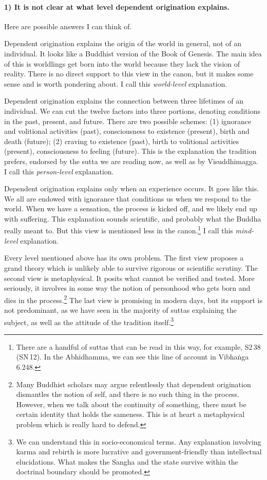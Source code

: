 \paragraph*{1) It is not clear at what level dependent origination explains.} Here are possible answers I can think of.
\begin{compactenum}[(1)]
\item Dependent origination explains the origin of the world in general, not of an individual. It looks like a Buddhist version of the Book of Genesis. The main idea of this is worldlings get born into the world because they lack the vision of reality. There is no direct support to this view in the canon, but it makes some sense and is worth pondering about. I call this \emph{world-level} explanation.
\item Dependent origination explains the connection between three lifetimes of an individual. We can cut the twelve factors into three portions, denoting conditions in the past, present, and future. There are two possible schemes: (1) ignorance and volitional activities (past), consciousness to existence (present), birth and death (future); (2) craving to existence (past), birth to volitional activities (present), consciousness to feeling (future). This is the explanation the tradition prefers, endorsed by the sutta we are reading now, as well as by Visuddhimagga. I call this \emph{person-level} explanation.
\item Dependent origination explains only when an experience occurs. It goes like this. We all are endowed with ignorance that conditions us when we respond to the world. When we have a sensation, the process is kicked off, and we likely end up with suffering. This explanation sounds scientific, and probably what the Buddha really meant to. But this view is mentioned less in the canon.\footnote{There are a handful of suttas that can be read in this way, for example, S2\,38 (SN\,12). In the Abhidhamma, we can see this line of account in Vibha\.nga 6.248.} I call this \emph{mind-level} explanation.
\end{compactenum}

Every level mentioned above has its own problem. The first view proposes a grand theory which is unlikely able to survive rigorous or scientific scrutiny. The second view is metaphysical. It posits what cannot be verified and tested. More seriously, it involves in some way the notion of personhood who gets born and dies in the process.\footnote{Many Buddhist scholars may argue relentlessly that dependent origination dismantles the notion of self, and there is no such thing in the process. However, when we talk about the continuity of something, there must be certain identity that holds the sameness. This is at heart a metaphysical problem which is really hard to defend.} The last view is promising in modern days, but its support is not predominant, as we have seen in the majority of suttas explaining the subject, as well as the attitude of the tradition itself.\footnote{We can understand this in socio-economical terms. Any explanation involving karma and rebirth is more lucrative and government-friendly than intellectual elucidations. What makes the Sangha and the state survive within the doctrinal boundary should be promoted.}

